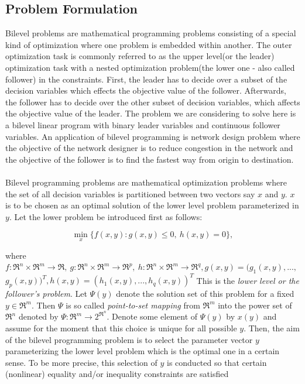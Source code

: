 \documentclass[a4paper, 12pt]{article}
\begin{document}
\subsection{Problem Formulation}
Bilevel problems are mathematical programming problems consisting of a special kind of optimization where one problem is embedded within another. The outer optimization task is commonly referred to as the upper level(or the leader) optimization task with a nested optimization problem(the lower one - also called follower) in the constraints. First, the leader has to decide over a subset of the decision variables which effects the objective value of the follower. Afterwards, the follower has to decide over the other subset of decision variables, which affects the objective value of the leader. The problem we are considering to solve here is a bilevel linear program with binary leader variables and continuous follower variables. An application of bilevel programming is network design problem where the objective of the network designer is to reduce congestion in the network and the objective of the follower is to find the fastest way from origin to destination.\\~\\
\noindent
Bilevel programming problems are mathematical optimization problems where the set of all decision variables is partitioned between two vectors say $x$ and $y$. $x$ is to be chosen as an optimal solution of the lower level problem parameterized in $y$. Let the lower problem be introduced first as follows:
\begin{large}
\boldmath\begin{equation*}
\min_{x}\{f(x,y):g(x,y)\leq0,\ h(x,y)=0\},
\end{equation*}
\end{large}
where $f:\Re^{n}\times\Re^{m}\rightarrow\Re,\ g:\Re^{n}\times\Re^{m}\rightarrow\Re^{p},\ h:\Re^{n}\times\Re^{m}\rightarrow\Re^{q}, g(x,y)=(g_{1}(x,y),...,$\\
$g_{p}(x,y))^{T}, h(x,y)=(h_{1}(x,y),...,h_{q}(x,y))^{T}$ This is the \textit{lower level or the follower's problem}. Let $\Psi\left(y\right)$ denote the solution set of this problem for a fixed $y\in\Re^{m}$. Then $\Psi$ is so called \textit{point-to-set mapping} from $\Re^{m}$ into the power set of $\Re^{n}$ denoted by $\Psi:\Re^{m}\rightarrow2^{\Re^{n}}$. Denote some element of $\Psi(y)$ by $x\left(y\right)$ and assume for the moment that this choice is unique for all possible $y$. Then, the aim of the bilevel programming problem is to select the parameter vector $y$ parameterizing the lower level problem which is the optimal one in a certain sense. To be more precise, this selection of $y$ is conducted so that certain (nonlinear) equality and/or inequality constraints are satisfied
\end{document}

